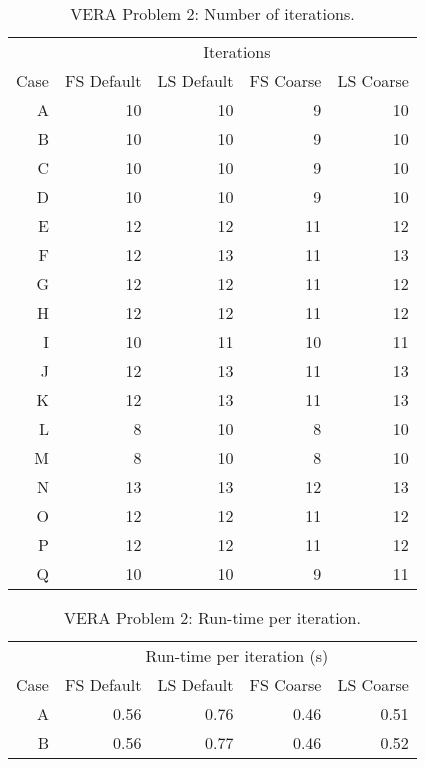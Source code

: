 {{{      %
      \begin{table}[htbp]
        \centering
        \caption{VERA Problem 2: Number of iterations.\label{tab:LSMOC:Lattice:Iterations}}
        \small
        \begin{tabular}{rrrrr}\toprule
                & \multicolumn{4}{c}{Iterations}\\\cline{2-5}
           Case & FS Default & LS Default & FS Coarse & LS Coarse\\\midrule
            A   &  10 & 10 &  9 & 10\\
            B   &  10 & 10 &  9 & 10\\
            C   &  10 & 10 &  9 & 10\\
            D   &  10 & 10 &  9 & 10\\
            E   &  12 & 12 & 11 & 12\\
            F   &  12 & 13 & 11 & 13\\
            G   &  12 & 12 & 11 & 12\\
            H   &  12 & 12 & 11 & 12\\
            I   &  10 & 11 & 10 & 11\\
            J   &  12 & 13 & 11 & 13\\
            K   &  12 & 13 & 11 & 13\\
            L   &   8 & 10 &  8 & 10\\
            M   &   8 & 10 &  8 & 10\\
            N   &  13 & 13 & 12 & 13\\
            O   &  12 & 12 & 11 & 12\\
            P   &  12 & 12 & 11 & 12\\
            Q   &  10 & 10 &  9 & 11\\\bottomrule
        \end{tabular}
      \end{table}
      \begin{table}[htbp]
        \centering
        \caption{VERA Problem 2: Run-time per iteration.\label{tab:LSMOC:Lattice:Run-time}}
        \small
        \begin{tabular}{rrrrr}\toprule
                & \multicolumn{4}{c}{Run-time per iteration (s)}\\\cline{2-5}
           Case & FS Default & LS Default & FS Coarse & LS Coarse\\\midrule
            A   &  0.56 & 0.76 & 0.46 & 0.51\\
            B   &  0.56 & 0.77 & 0.46 & 0.52\\

\end{tabular}
\end{table}}}}
